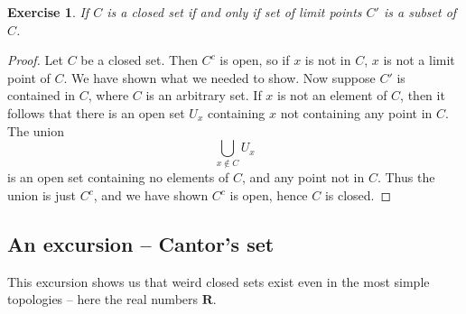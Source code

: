 \documentclass{report}
\theoremstyle{plain}
\newtheorem{exercise}{Exercise}[section]
\theoremstyle{definition}
\begin{document}
\begin{exercise}
    If $C$ is a closed set if and only if set of limit points $C'$  is a subset of $C$.
\end{exercise}
\begin{proof}
    Let $C$ be a closed set. Then $C^c$ is open, so if $x$ is not in $C$, $x$ is not a limit point of $C$. We have shown what we needed to show. Now suppose $C'$ is contained in $C$, where $C$ is an arbitrary set. If $x$ is not an element of $C$, then it follows that there is an open set $U_x$ containing $x$ not containing any point in $C$. The union
    \[ \bigcup_{x \notin C} U_x \]
    is an open set containing no elements of $C$, and any point not in $C$. Thus the union is just $C^c$, and we have shown $C^c$ is open, hence $C$ is closed.
\end{proof}

\subsection{An excursion -- Cantor's set}

This excursion shows us that weird closed sets exist even in the most simple topologies -- here the real numbers $\mathbf{R}$.
\end{document}
